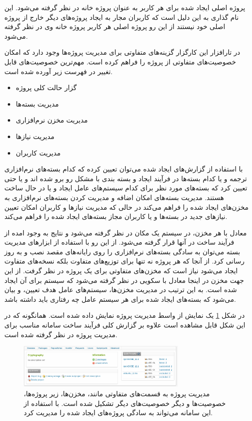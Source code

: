 پروژه اصلی ایجاد شده برای هر کاربر به عنوان پروژه خانه
در نظر گرفته می‌شود. این نام گذاری به این دلیل است که کاربران مجار به ایجاد
پروژه‌های دیگر خارج از پروژه اصلی خود نیستند از این رو پروژه اصلی هر کاربر 
پروژه خانه وی در نظر گرفته می‌شود.

در تارافزار این کارگزار گزینه‌های متفاوتی برای مدیریت پروژه‌ها وجود دارد که
امکان خصوصیت‌های متفاوتی از پروژه را فراهم کرده است. مهم‌ترین خصوصیت‌های قابل
تغییر در فهرست زیر آورده شده است.

\begin{itemize}
  \item گزار حالت کلی پروژه
  \item مدیریت بسته‌ها
  \item مدیریت مخزن نرم‌افزاری
  \item مدیریت نیازها
  \item مدیریت کاربران
\end{itemize}

با استفاده از گزارش‌های ایجاد شده می‌توان تعیین کرده که کدام بسته‌های نرم‌افزاری
ترجمه و یا کدام بسته‌ها در فرآیند ایجاد و بسته بندی با مشکل رو برو شده اند و یا
حتی تعیین کرد که بسته‌های مورد نظر برای کدام سیستم‌های عامل ایجاد و یا در حال
ساخت هستند. مدیریت بسته‌های امکان اضافه و مدیریت کردن بسته‌های نرم‌افزاری به
مخزن‌های ایجاد شده را فراهم می‌کند در حالی که مدیریت نیازها و کاربران امکان
تعیین نیازهای جدید در بسته‌ها و یا کاربران مجاز بسته‌های ایجاد شده را فراهم
می‌کند.

معادل با هر مخزن، در سیستم یک مکان در نظر گرفته می‌شود و نتایج به وجود امده از
فرآیند ساخت در آنها قرار گرفته می‌شود. از این رو با استفاده از ابزارهای مدیریت
بسته می‌توان به سادگی بسته‌های نرم‌افزاری را روی رایانه‌های مقصد نصب و به روز
رسانی کرد. از آنجا که هر پروژه نه تنها برای توزیع‌های متفاوت بلکه نسخه‌های
متفاوت ایجاد می‌شود نیاز است که مخزن‌های متفاوتی برای یک پروژه در نظر گرفت. از
این جهت مخزن در اینجا معادل با سکویی در نظر گرفته می‌شود که سیستم برای آن ایجاد
شده است. به این ترتیب در مدیریت مخزن‌ها، سیستم‌های عامل
هدف تعیین، و بیان می‌شود که بسته‌های ایجاد شده
برای هر سیستم عامل چه رفتاری باید داشته باشد.

در شکل  \ref{image/standard/build/opensuse-project-overview} یک نمایش از واسط
مدیریت پروژه نمایش داده شده است. همانگونه که در این شکل قابل مشاهده است علاوه بر
گزارش کلی فرآیند ساخت سامانه مناسب برای مدیریت پروژه در نظر گرفته شده است.

\begin{figure}
\centering
\includegraphics[width=0.75\textwidth]{image/standard/build/opensuse-project-overview.png}
\caption[مدیریت پروژه‌ها در کارگزار ساخت]{
	مدیریت پروژه به قسمت‌های متفاوتی مانند، مخزن‌ها، زیر پروژه‌ها، خصوصیت‌ها و دیگر
	خصوصیت‌های دیگر تشکیل شده است. با استفاده از این سامانه می‌تواند به سادگی
	پروژه‌های ایجاد شده را مدیریت کرد.
}
\label{image/standard/build/opensuse-project-overview}
\end{figure}

